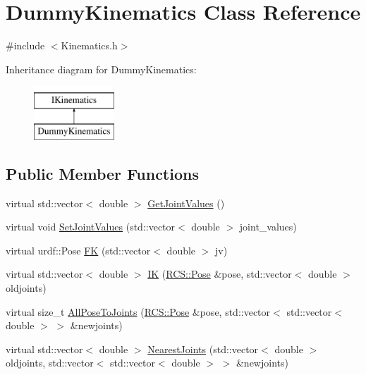 \hypertarget{classDummyKinematics}{\section{Dummy\-Kinematics Class Reference}
\label{classDummyKinematics}
}


{\ttfamily \#include $<$Kinematics.\-h$>$}

Inheritance diagram for Dummy\-Kinematics\-:\begin{figure}[H]
\begin{center}
\leavevmode
\includegraphics[height=2.000000cm]{classDummyKinematics}
\end{center}
\end{figure}
\subsection*{Public Member Functions}
\begin{DoxyCompactItemize}
\item 
virtual std\-::vector$<$ double $>$ \hyperlink{classDummyKinematics_a630b1a37d23881be53147c07a87bffad}{Get\-Joint\-Values} ()
\item 
virtual void \hyperlink{classDummyKinematics_a0b5a581fb840f304cebc80fb00eb7138}{Set\-Joint\-Values} (std\-::vector$<$ double $>$ joint\-\_\-values)
\item 
virtual urdf\-::\-Pose \hyperlink{classDummyKinematics_a6b69b528361a7f7654f1fa4ba9c019fb}{F\-K} (std\-::vector$<$ double $>$ jv)
\item 
virtual std\-::vector$<$ double $>$ \hyperlink{classDummyKinematics_aed9dcd58e607ccfef58975040567a04a}{I\-K} (\hyperlink{namespaceRCS_aac02c0fd845140ea93a2a9254b1db6f6}{R\-C\-S\-::\-Pose} \&pose, std\-::vector$<$ double $>$ oldjoints)
\item 
virtual size\-\_\-t \hyperlink{classDummyKinematics_ac96c0c98a0ca7847ae38152c6de17d1c}{All\-Pose\-To\-Joints} (\hyperlink{namespaceRCS_aac02c0fd845140ea93a2a9254b1db6f6}{R\-C\-S\-::\-Pose} \&pose, std\-::vector$<$ std\-::vector$<$ double $>$ $>$ \&newjoints)
\item 
virtual std\-::vector$<$ double $>$ \hyperlink{classDummyKinematics_a5069cce91772b48d105065f12f6e15bc}{Nearest\-Joints} (std\-::vector$<$ double $>$ oldjoints, std\-::vector$<$ std\-::vector$<$ double $>$ $>$ \&newjoints)
\end{DoxyCompactItemize}


